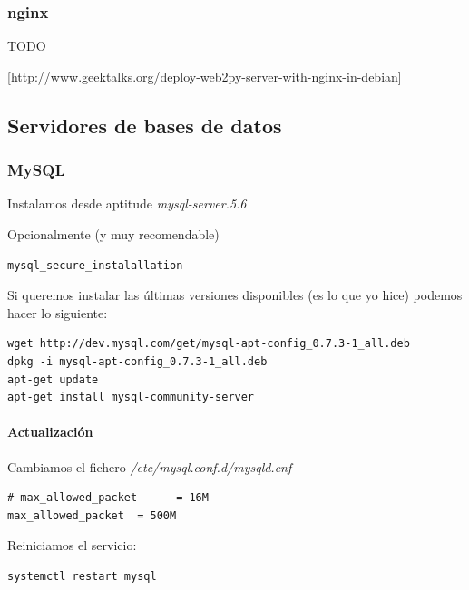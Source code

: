 \documentclass[12pt,spanish,]{scrartcl}
\let\oldparagraph\paragraph
\renewcommand{\paragraph}[1]{\oldparagraph{#1}\mbox{}}
\begin{document}
\hypertarget{nginx}{%
\subsubsection{nginx}\label{nginx}}

TODO

{[}http://www.geektalks.org/deploy-web2py-server-with-nginx-in-debian{]}

\hypertarget{servidores-de-bases-de-datos}{%
\subsection{Servidores de bases de
datos}\label{servidores-de-bases-de-datos}}

\hypertarget{mysql}{%
\subsubsection{MySQL}\label{mysql}}

Instalamos desde aptitude \emph{mysql-server.5.6}

Opcionalmente (y muy recomendable)

\begin{verbatim}
mysql_secure_instalallation
\end{verbatim}

Si queremos instalar las últimas versiones disponibles (es lo que yo
hice) podemos hacer lo siguiente:

\begin{verbatim}
wget http://dev.mysql.com/get/mysql-apt-config_0.7.3-1_all.deb
dpkg -i mysql-apt-config_0.7.3-1_all.deb
apt-get update
apt-get install mysql-community-server
\end{verbatim}

\hypertarget{actualizaciuxf3n}{%
\paragraph{Actualización}\label{actualizaciuxf3n}}

Cambiamos el fichero \emph{/etc/mysql.conf.d/mysqld.cnf}

\begin{verbatim}
# max_allowed_packet      = 16M
max_allowed_packet  = 500M
\end{verbatim}

Reiniciamos el servicio:

\begin{verbatim}
systemctl restart mysql
\end{verbatim}
\end{document}
